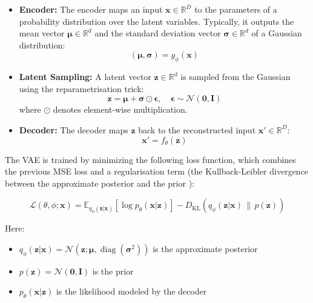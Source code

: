 \documentclass{article}
\begin{document}
\begin{itemize}
  \item \textbf{Encoder:} The encoder maps an input \( \mathbf{x} \in \mathbb{R}^D \) to the parameters of a probability distribution over the latent variables. Typically, it outputs the mean vector \( \boldsymbol{\mu} \in \mathbb{R}^d \) and the standard deviation vector \( \boldsymbol{\sigma} \in \mathbb{R}^d \) of a Gaussian distribution:
  \begin{equation}
  (\boldsymbol{\mu}, \boldsymbol{\sigma}) = g_{\phi}(\mathbf{x})
  \end{equation}
  
  \item \textbf{Latent Sampling:} A latent vector \( \mathbf{z} \in \mathbb{R}^d \) is sampled from the Gaussian using the reparametrisation trick:
  \begin{equation}
  \mathbf{z} = \boldsymbol{\mu} + \boldsymbol{\sigma} \odot \boldsymbol{\epsilon}, \quad \boldsymbol{\epsilon} \sim \mathcal{N}(\mathbf{0}, \mathbf{I})
  \end{equation}
  where \( \odot \) denotes element-wise multiplication.
  
  \item \textbf{Decoder:} The decoder maps \( \mathbf{z} \) back to the reconstructed input \( \mathbf{x}' \in \mathbb{R}^D \):
  \begin{equation}
  \mathbf{x}' = f_{\theta}(\mathbf{z})
  \end{equation}
\end{itemize}

The VAE is trained by minimizing the following loss function, which combines the previous MSE loss and a regularisation term (the Kullback-Leibler divergence between the approximate posterior and the prior \citep{Kingma2013}):

\begin{equation}\label{VAE loss function}
\mathcal{L}(\theta, \phi; \mathbf{x}) = \mathbb{E}_{q_{\phi}(\mathbf{z}|\mathbf{x})} \left[ \log p_{\theta}(\mathbf{x}|\mathbf{z}) \right] - D_{\text{KL}} \left( q_{\phi}(\mathbf{z}|\mathbf{x}) \, \| \, p(\mathbf{z}) \right)
\end{equation}

Here:
\begin{itemize}
  \item \( q_{\phi}(\mathbf{z}|\mathbf{x}) = \mathcal{N}(\mathbf{z}; \boldsymbol{\mu}, \operatorname{diag}(\boldsymbol{\sigma}^2)) \) is the approximate posterior
  \item \( p(\mathbf{z}) = \mathcal{N}(\mathbf{0}, \mathbf{I}) \) is the prior
  \item \( p_{\theta}(\mathbf{x}|\mathbf{z}) \) is the likelihood modeled by the decoder
\end{itemize}
\end{document}

